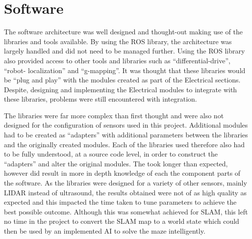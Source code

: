 \section{Software}\label{eval/soft}
The software architecture was well designed and thought-out making use of the 
libraries and tools available. By using the ROS library, the architecture was largely 
handled and did not need to be managed further. Using the ROS library also provided 
access to other tools and libraries such as ``differential-drive'', ``robot-
localization'' and ``g-mapping''. It was thought that these libraries would be ``plug 
and play'' with the modules created as part of the Electrical sections. Despite, 
designing and implementing the Electrical modules to integrate with these libraries, 
problems were still encountered with integration. 

The libraries were far more complex than first thought and were also not designed for 
the configuration of sensors used in this project. Additional modules had to be 
created as ``adapters'' with additional parameters between the libraries and the 
originally created modules. Each of the libraries used therefore also had to be fully 
understood, at a source code level, in order to construct the ``adapters'' and alter 
the original modules. The took longer than expected, however did result in more in 
depth knowledge of each the component parts of the software. As the libraries were 
designed for a variety of other sensors, mainly LIDAR instead of ultrasound, the 
results obtained were not of as high quality as expected and this impacted the time 
taken to tune parameters to achieve the best possible outcome. Although this was 
somewhat achieved for SLAM, this left no time in the project to convert the SLAM map 
to a world state which could then be used by an implemented AI to solve the maze 
intelligently. 


